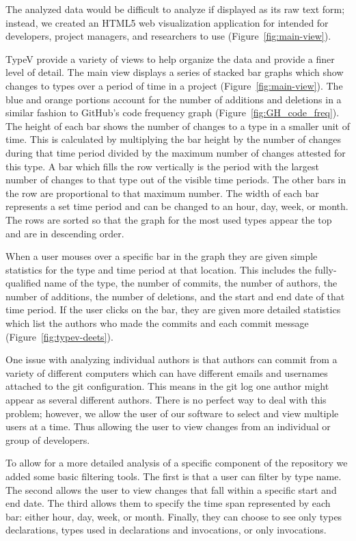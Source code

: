 \documentclass[conference]{IEEEtran}
\begin{document}
The analyzed data would be difficult to analyze if displayed as its raw text form; instead, we created an HTML5 web visualization application for intended for developers, project managers, and researchers to use (Figure~\ref{fig:main-view}).

TypeV provide a variety of views to help organize the data and provide a finer level of detail. The main view displays a series of stacked bar graphs which show changes to types over a period of time in a project (Figure~\ref{fig:main-view}). The blue and orange portions account for the number of additions and deletions in a similar fashion to GitHub’s code frequency graph (Figure~\ref{fig:GH_code_freq}). The height of each bar shows the number of changes to a type in a smaller unit of time. This is calculated by multiplying the bar height by the number of changes during that time period divided by the maximum number of changes attested for this type. A bar which fills the row vertically is the period with the largest number of changes to that type out of the visible time periods. The other bars in the row are proportional to that maximum number. The width of each bar represents a set time period and can be changed to an hour, day, week, or month. The rows are sorted so that the graph for the most used types appear the top and are in descending order.

When a user mouses over a specific bar in the graph they are given simple statistics for the type and time period at that location. This includes the fully-qualified name of the type, the number of commits, the number of authors, the number of additions, the number of deletions, and the start and end date of that time period. If the user clicks on the bar, they are given more detailed statistics which list the authors who made the commits and each commit message (Figure~\ref{fig:typev-deets}).

One issue with analyzing individual authors is that authors can commit from a variety of different computers which can have different emails and usernames attached to the git configuration. This means in the git log one author might appear as several different authors. There is no perfect way to deal with this problem; however, we allow the user of our software to select and view multiple users at a time. Thus allowing the user to view changes from an individual or group of developers.

To allow for a more detailed analysis of a specific component of the repository we added some basic filtering tools. The first is that a user can filter by type name. The second allows the user to view changes that fall within a specific start and end date. The third allows them to specify the time span represented by each bar: either hour, day, week, or month. Finally, they can choose to see only types declarations, types used in declarations and invocations, or only invocations.
\end{document}
